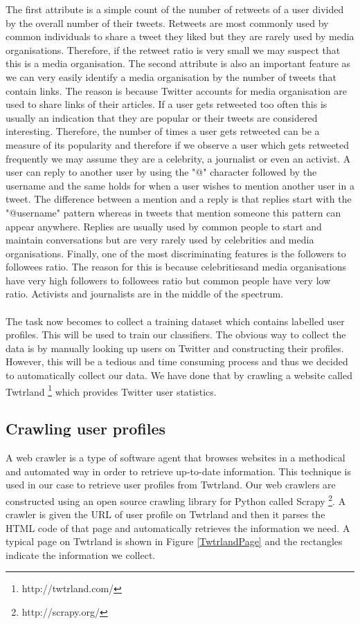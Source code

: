 The first attribute is a simple count of the number of retweets of a user divided by the overall number of their tweets. Retweets are most commonly used by common individuals to share a tweet they liked but they are rarely used by media organisations. Therefore, if the retweet ratio is very small we may suspect that this is a media organisation. The second attribute is also an important feature as we can very easily identify a media organisation by the number of tweets that contain links. The reason is because Twitter accounts for media organisation are used to share links of their articles. If a user gets retweeted too often this is usually an indication that they are popular or their tweets are considered interesting. Therefore, the number of times a user gets retweeted can be a measure of its popularity and therefore if we observe a user which gets retweeted frequently we may assume they are a celebrity, a journalist or even an activist. A user can reply to another user by using the "@" character followed by the username and the same holds for when a user wishes to mention another user in a tweet. The difference between a mention and a reply is that replies start with the "@username" pattern whereas in tweets that mention someone this pattern can appear anywhere. Replies are usually used by common people to start and maintain conversations but are very rarely used by celebrities and media organisations. Finally, one of the most discriminating features is the followers to followees ratio. The reason for this is because celebritiesand media organisations have very high followers to followees ratio but common people have very low ratio. Activists and journalists are in the middle of the spectrum.\\\\
The task now becomes to collect a training dataset which contains labelled user profiles. This will be used to train our classifiers. The obvious way to collect the data is by manually looking up users on Twitter and constructing their profiles. However, this will be a tedious and time consuming process and thus we decided to automatically collect our data. We have done that by crawling a website called Twtrland \footnote{http://twtrland.com/} which provides Twitter user statistics.   

\subsection{Crawling user profiles}
A web crawler is a type of software agent that browses websites in a methodical and automated way in order to retrieve up-to-date information. This technique is used in our case to retrieve user profiles from Twtrland. Our web crawlers are constructed using an open source crawling library for Python called Scrapy \footnote{http://scrapy.org/}. A crawler is given the URL of user profile on Twtrland and then it parses the HTML code of that page and automatically retrieves the information we need. A typical page on Twtrland is shown in Figure \ref{TwtrlandPage} and the rectangles indicate the information we collect. 

